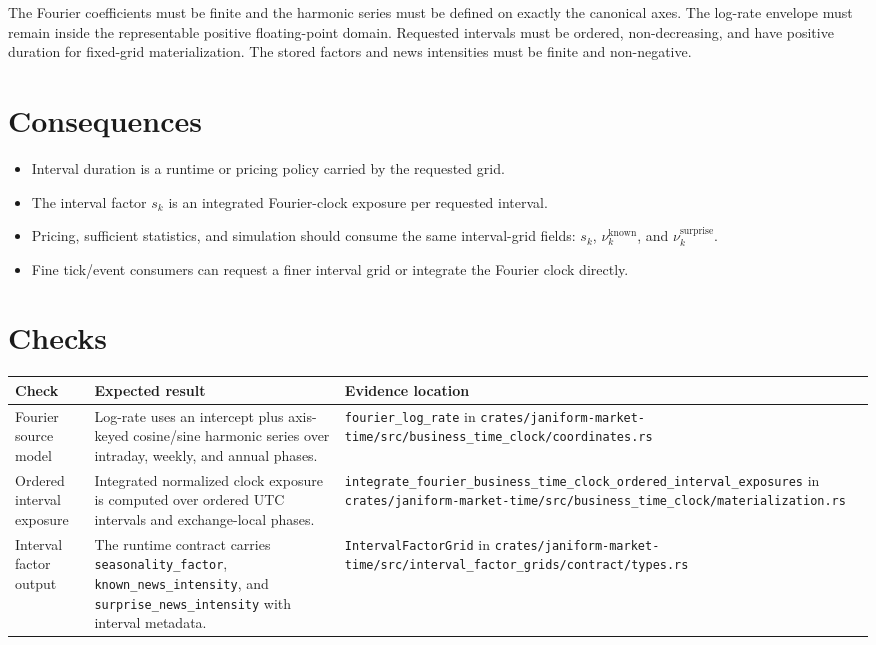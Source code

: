 \documentclass[11pt]{article}
\begin{document}
The Fourier coefficients must be finite and the harmonic series must be
defined on exactly the canonical axes.
The log-rate envelope must remain inside the representable positive
floating-point domain.
Requested intervals must be ordered, non-decreasing, and have positive
duration for fixed-grid materialization.
The stored factors and news intensities must be finite and non-negative.

\section{Consequences}

\begin{itemize}
    \item Interval duration is a runtime or pricing policy carried by the requested grid.
    \item The interval factor \(s_k\) is an integrated Fourier-clock exposure per requested interval.
    \item Pricing, sufficient statistics, and simulation should consume the same interval-grid fields: \(s_k\), \(\nu_k^{\mathrm{known}}\), and \(\nu_k^{\mathrm{surprise}}\).
    \item Fine tick/event consumers can request a finer interval grid or integrate the Fourier clock directly.
\end{itemize}

\section{Checks}

\begin{tabularx}{\textwidth}{XXX}
\toprule
Check & Expected result & Evidence location\\
\midrule
Fourier source model
& Log-rate uses an intercept plus axis-keyed cosine/sine harmonic series over intraday, weekly, and annual phases.
& \texttt{fourier\_log\_rate} in \texttt{crates/janiform-market-time/src/business\_time\_clock/coordinates.rs}\\
Ordered interval exposure
& Integrated normalized clock exposure is computed over ordered UTC intervals and exchange-local phases.
& \texttt{integrate\_fourier\_business\_time\_clock\_ordered\_interval\_exposures} in \texttt{crates/janiform-market-time/src/business\_time\_clock/materialization.rs}\\
Interval factor output
& The runtime contract carries \texttt{seasonality\_factor}, \texttt{known\_news\_intensity}, and \texttt{surprise\_news\_intensity} with interval metadata.
& \texttt{IntervalFactorGrid} in \texttt{crates/janiform-market-time/src/interval\_factor\_grids/contract/types.rs}\\
\bottomrule
\end{tabularx}
\end{document}
